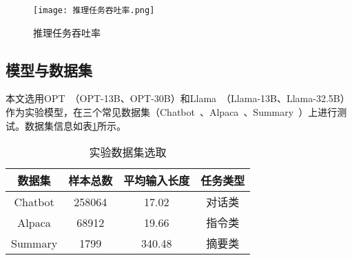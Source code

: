 
\begin{figure*}[!htbp]
  \centering
  \texttt{[image: 推理任务吞吐率.png]}
  \caption{推理任务吞吐率}
  \label{Fig:推理任务吞吐率}
\end{figure*}

\subsection{模型与数据集}

本文选用OPT~\cite{OPT}（OPT-13B、OPT-30B）和Llama~\cite{Llama}（Llama-13B、Llama-32.5B）作为实验模型，在三个常见数据集（Chatbot~\cite{Chatbot}、Alpaca~\cite{Alpaca}、Summary~\cite{Summary}）上进行测试。数据集信息如表\ref{Table:实验数据集选取}所示。

\begin{table}[H]
  \centering
  \caption{实验数据集选取}
  \label{Table:实验数据集选取}
  \renewcommand{\arraystretch}{1.15}
  \small
  \begin{tabular}{c c c c}
    \toprule
    \textbf{数据集} & \textbf{样本总数} & \textbf{平均输入长度} & \textbf{任务类型} \\
    \midrule
    Chatbot & 258064 & 17.02 & 对话类 \\
    Alpaca & 68912 & 19.66 & 指令类 \\
    Summary & 1799 & 340.48 & 摘要类 \\
    \bottomrule
  \end{tabular}
\end{table}

